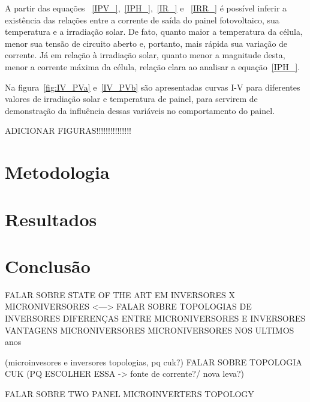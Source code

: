 \documentclass[
	12pt,				%
	openright,			%
	onseside,
	a4paper,			%
	english,			%
	french,				%
	spanish,			%
	brazil,				%
	]{abntex2}
\begin{document}
A partir das equações ~\ref{IPV_},~\ref{IPH_},~\ref{IR_} e ~\ref{IRR_} é possível inferir a existência das relações entre a corrente de saída do painel fotovoltaico, sua temperatura e a irradiação solar. De fato, quanto maior a temperatura da célula, menor sua tensão de circuito aberto e, portanto, mais rápida sua variação de corrente. Já em relação à irradiação solar, quanto menor a magnitude desta, menor a corrente máxima da célula, relação clara ao analisar a equação~\ref{IPH_}.

Na figura~\ref{fig:IV_PVa} e~\ref{IV_PVb} são apresentadas curvas I-V para diferentes valores de irradiação solar e temperatura de painel, para servirem de demonstração da influência dessas variáveis no comportamento do painel.

ADICIONAR FIGURAS!!!!!!!!!!!!!!!

\chapter{Metodologia}

\chapter{Resultados}

\chapter{Conclusão}

FALAR SOBRE  STATE OF THE ART EM INVERSORES X MICRONIVERSORES <---> FALAR SOBRE TOPOLOGIAS DE INVERSORES
DIFERENÇAS ENTRE MICRONIVERSORES E INVERSORES
VANTAGENS MICRONIVERSORES
MICRONIVERSORES NOS ULTIMOS anos

(microinvesores e inversores topologias, pq cuk?)
FALAR SOBRE TOPOLOGIA CUK (PQ ESCOLHER ESSA -> fonte de corrente?/ nova leva?)


	FALAR SOBRE TWO PANEL MICROINVERTERS TOPOLOGY




\end{document}
